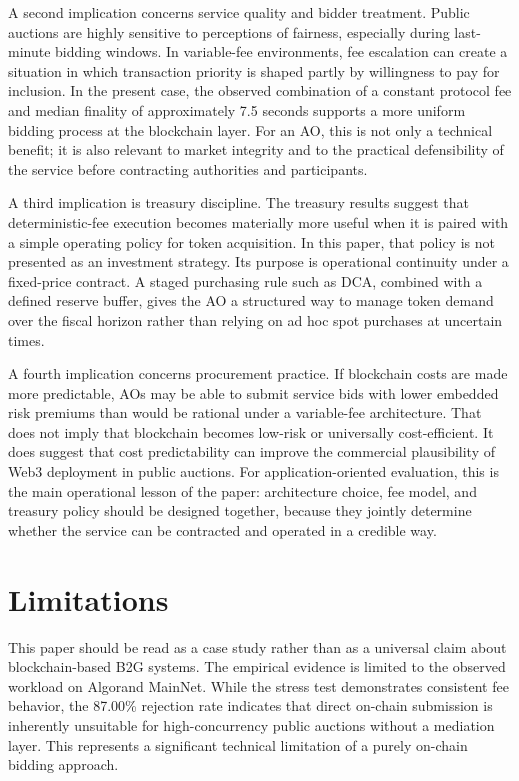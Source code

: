 \documentclass[runningheads]{llncs}
\begin{document}
A second implication concerns service quality and bidder treatment. Public
auctions are highly sensitive to perceptions of fairness, especially during
last-minute bidding windows. In variable-fee environments, fee escalation can
create a situation in which transaction priority is shaped partly by willingness
to pay for inclusion. In the present case, the observed combination of a constant
protocol fee and median finality of approximately 7.5 seconds supports a more
uniform bidding process at the blockchain layer. For an AO, this is not only a
technical benefit; it is also relevant to market integrity and to the practical
defensibility of the service before contracting authorities and participants.

A third implication is treasury discipline. The treasury results suggest that
deterministic-fee execution becomes materially more useful when it is paired with
a simple operating policy for token acquisition. In this paper, that policy is not
presented as an investment strategy. Its purpose is operational continuity under
a fixed-price contract. A staged purchasing rule such as DCA, combined with a
defined reserve buffer, gives the AO a structured way to manage token demand
over the fiscal horizon rather than relying on ad hoc spot purchases at uncertain
times.

A fourth implication concerns procurement practice. If blockchain costs are made
more predictable, AOs may be able to submit service bids with lower embedded
risk premiums than would be rational under a variable-fee architecture. That does
not imply that blockchain becomes low-risk or universally cost-efficient. It does
suggest that cost predictability can improve the commercial plausibility of Web3
deployment in public auctions. For application-oriented evaluation, this is the
main operational lesson of the paper: architecture choice, fee model, and treasury
policy should be designed together, because they jointly determine whether the
service can be contracted and operated in a credible way.

\section{Limitations}

This paper should be read as a case study rather than as a universal claim about blockchain-based B2G systems. The empirical evidence is limited to the observed workload on Algorand MainNet. While the stress test demonstrates consistent fee behavior, the 87.00\% rejection rate indicates that direct on-chain submission is inherently unsuitable for high-concurrency public auctions without a mediation layer. This represents a significant technical limitation of a purely on-chain bidding approach.
\end{document}
